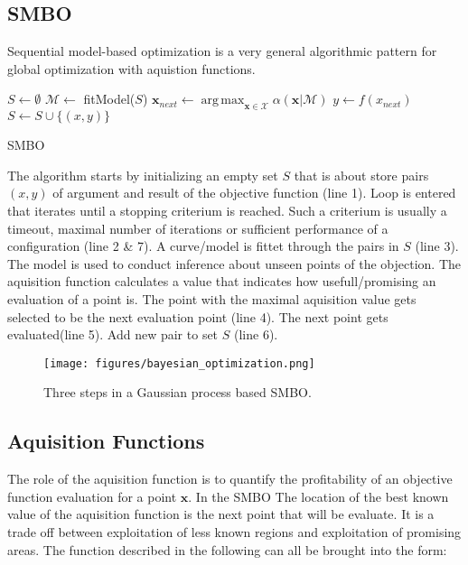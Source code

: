 \documentclass[english]{article}
\newcommand{\x}{\mathbf{x}}
\newcommand{\M}{\mathcal{M}}
\newcommand{\X}{\mathcal{X}}
\DeclareMathOperator*{\argmax}{arg\,max}
\begin{document}
\subsection{SMBO}
Sequential model-based optimization is a very general algorithmic pattern for global optimization with aquistion functions.

\begin{algorithm}[H]
\SetAlgoLined

$S \leftarrow \emptyset$\;
{
  $\mathcal{M} \leftarrow$ fitModel($S$)\;
  $\x_{next} \leftarrow \argmax_{\x \in \X} \alpha(\x|\M)$\;
  $y \leftarrow f(x_{next})$\;
  $S \leftarrow S \cup \{(x,y)\}$\;
}
\caption{SMBO}
\end{algorithm}

The algorithm starts by initializing an empty set $S$ that is about store pairs $(x,y)$ of argument and result of the objective function (line 1). Loop is entered that iterates until a stopping criterium is reached. Such a criterium is usually a timeout, maximal number of iterations or sufficient performance of a configuration (line 2 \& 7). A curve/model is fittet through the pairs in $S$ (line 3). The model is used to conduct inference about unseen points of the objection. The aquisition function calculates a value that indicates how usefull/promising an evaluation of a point is. The point with the maximal aquisition value gets selected to be the next evaluation point (line 4). The next point gets evaluated(line 5). Add new pair to set $S$ (line 6).

\begin{figure}
  \texttt{[image: figures/bayesian\_optimization.png]}
  \caption{Three steps in a Gaussian process based SMBO.}
  \label{bayesian optimization}
\end{figure}

\subsection{Aquisition Functions}

The role of the aquisition function is to quantify the profitability of an objective function evaluation for a point $\x$. In the SMBO The location of the best known value of the aquisition function is the next point that will be evaluate. It is a trade off between exploitation of less known regions and exploitation of promising areas. The function described in the following can all be brought into the form:
\end{document}
